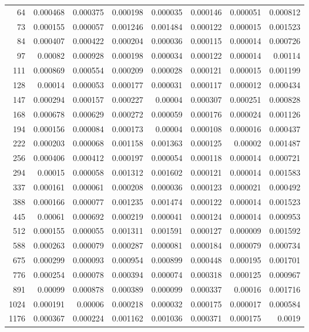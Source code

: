 \begin{tabular}{r r r r r r r r}
64 & 0.000468 & 0.000375 & 0.000198 & 0.000035 & 0.000146 & 0.000051 & 0.000812 \\
73 & 0.000155 & 0.000057 & 0.001246 & 0.001484 & 0.000122 & 0.000015 & 0.001523 \\
84 & 0.000407 & 0.000422 & 0.000204 & 0.000036 & 0.000115 & 0.000014 & 0.000726 \\
97 & 0.00082 & 0.000928 & 0.000198 & 0.000034 & 0.000122 & 0.000014 & 0.00114 \\
111 & 0.000869 & 0.000554 & 0.000209 & 0.000028 & 0.000121 & 0.000015 & 0.001199 \\
128 & 0.00014 & 0.000053 & 0.000177 & 0.000031 & 0.000117 & 0.000012 & 0.000434 \\
147 & 0.000294 & 0.000157 & 0.000227 & 0.00004 & 0.000307 & 0.000251 & 0.000828 \\
168 & 0.000678 & 0.000629 & 0.000272 & 0.000059 & 0.000176 & 0.000024 & 0.001126 \\
194 & 0.000156 & 0.000084 & 0.000173 & 0.00004 & 0.000108 & 0.000016 & 0.000437 \\
222 & 0.000203 & 0.000068 & 0.001158 & 0.001363 & 0.000125 & 0.00002 & 0.001487 \\
256 & 0.000406 & 0.000412 & 0.000197 & 0.000054 & 0.000118 & 0.000014 & 0.000721 \\
294 & 0.00015 & 0.000058 & 0.001312 & 0.001602 & 0.000121 & 0.000014 & 0.001583 \\
337 & 0.000161 & 0.000061 & 0.000208 & 0.000036 & 0.000123 & 0.000021 & 0.000492 \\
388 & 0.000166 & 0.000077 & 0.001235 & 0.001474 & 0.000122 & 0.000014 & 0.001523 \\
445 & 0.00061 & 0.000692 & 0.000219 & 0.000041 & 0.000124 & 0.000014 & 0.000953 \\
512 & 0.000155 & 0.000055 & 0.001311 & 0.001591 & 0.000127 & 0.000009 & 0.001592 \\
588 & 0.000263 & 0.000079 & 0.000287 & 0.000081 & 0.000184 & 0.000079 & 0.000734 \\
675 & 0.000299 & 0.000093 & 0.000954 & 0.000899 & 0.000448 & 0.000195 & 0.001701 \\
776 & 0.000254 & 0.000078 & 0.000394 & 0.000074 & 0.000318 & 0.000125 & 0.000967 \\
891 & 0.00099 & 0.000878 & 0.000389 & 0.000099 & 0.000337 & 0.00016 & 0.001716 \\
1024 & 0.000191 & 0.00006 & 0.000218 & 0.000032 & 0.000175 & 0.000017 & 0.000584 \\
1176 & 0.000367 & 0.000224 & 0.001162 & 0.001036 & 0.000371 & 0.000175 & 0.0019 \\

\end{tabular}
